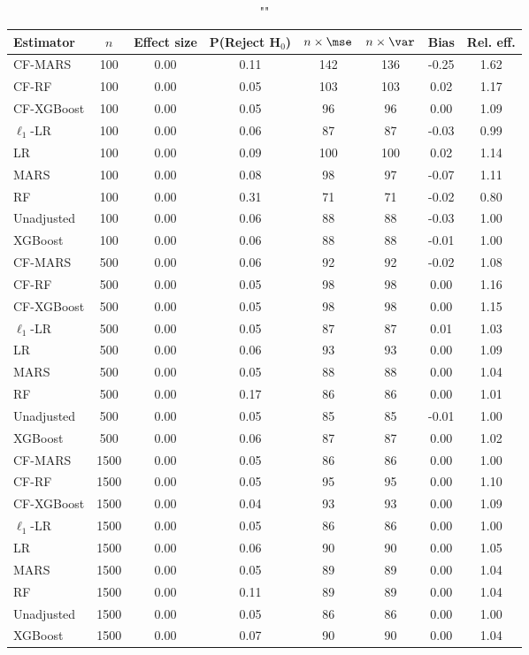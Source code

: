 \begin{table}
\centering
\caption{""}
\begin{tabular}{lccccccc}
\toprule
Estimator & $n$ & Effect size & P(Reject H$_0$) & $n\times\mse$ & $n\times \var$ & Bias & Rel. eff.\\ \midrule
CF-MARS & 100 & 0.00 & 0.11 & 142 & 136 & -0.25 & 1.62 \\ 
CF-RF & 100 & 0.00 & 0.05 & 103 & 103 &  0.02 & 1.17 \\ 
CF-XGBoost & 100 & 0.00 & 0.05 &  96 &  96 &  0.00 & 1.09 \\ 
$\ell_1$-LR & 100 & 0.00 & 0.06 &  87 &  87 & -0.03 & 0.99 \\ 
LR & 100 & 0.00 & 0.09 & 100 & 100 &  0.02 & 1.14 \\ 
MARS & 100 & 0.00 & 0.08 &  98 &  97 & -0.07 & 1.11 \\ 
RF & 100 & 0.00 & 0.31 &  71 &  71 & -0.02 & 0.80 \\ 
Unadjusted & 100 & 0.00 & 0.06 &  88 &  88 & -0.03 & 1.00 \\ 
XGBoost & 100 & 0.00 & 0.06 &  88 &  88 & -0.01 & 1.00 \\ \addlinespace 
CF-MARS & 500 & 0.00 & 0.06 &  92 &  92 & -0.02 & 1.08 \\ 
CF-RF & 500 & 0.00 & 0.05 &  98 &  98 &  0.00 & 1.16 \\ 
CF-XGBoost & 500 & 0.00 & 0.05 &  98 &  98 &  0.00 & 1.15 \\ 
$\ell_1$-LR & 500 & 0.00 & 0.05 &  87 &  87 &  0.01 & 1.03 \\ 
LR & 500 & 0.00 & 0.06 &  93 &  93 &  0.00 & 1.09 \\ 
MARS & 500 & 0.00 & 0.05 &  88 &  88 &  0.00 & 1.04 \\ 
RF & 500 & 0.00 & 0.17 &  86 &  86 &  0.00 & 1.01 \\ 
Unadjusted & 500 & 0.00 & 0.05 &  85 &  85 & -0.01 & 1.00 \\ 
XGBoost & 500 & 0.00 & 0.06 &  87 &  87 &  0.00 & 1.02 \\ \addlinespace 
CF-MARS & 1500 & 0.00 & 0.05 &  86 &  86 &  0.00 & 1.00 \\ 
CF-RF & 1500 & 0.00 & 0.05 &  95 &  95 &  0.00 & 1.10 \\ 
CF-XGBoost & 1500 & 0.00 & 0.04 &  93 &  93 &  0.00 & 1.09 \\ 
$\ell_1$-LR & 1500 & 0.00 & 0.05 &  86 &  86 &  0.00 & 1.00 \\ 
LR & 1500 & 0.00 & 0.06 &  90 &  90 &  0.00 & 1.05 \\ 
MARS & 1500 & 0.00 & 0.05 &  89 &  89 &  0.00 & 1.04 \\ 
RF & 1500 & 0.00 & 0.11 &  89 &  89 &  0.00 & 1.04 \\ 
Unadjusted & 1500 & 0.00 & 0.05 &  86 &  86 &  0.00 & 1.00 \\ 
XGBoost & 1500 & 0.00 & 0.07 &  90 &  90 &  0.00 & 1.04 \\
\bottomrule
\end{tabular}
\end{table}

